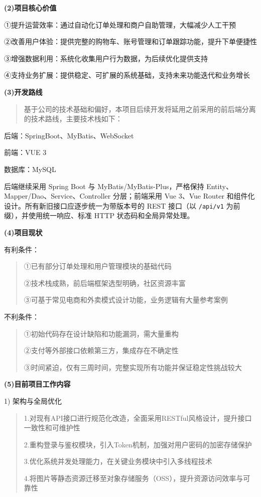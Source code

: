 \textbf{(2)项目核心价值}

①提升运营效率：通过自动化订单处理和商户自助管理，大幅减少人工干预

②改善用户体验：提供完整的购物车、账号管理和订单跟踪功能，提升下单便捷性

③增强数据利用：系统化收集用户行为数据，为后续优化提供支持

④支持业务扩展：提供稳定、可扩展的系统基础，支持未来功能迭代和业务增长

\textbf{(3)开发路线}

\begin{quote}
基于公司的技术基础和偏好，本项目后续开发将延用之前采用的前后端分离的技术路线，主要技术栈如下：
\end{quote}

后端：SpringBoot、MyBatis、WebSocket

前端：VUE 3

数据库：MySQL

{\color{red}
后端继续采用 Spring Boot 与 MyBatis/MyBatis-Plus，严格保持 Entity、Mapper/Dao、Service、Controller 分层；前端采用 Vue 3、Vue Router 和组件化设计。所有新旧接口应逐步统一为带版本号的 REST 接口（以 \texttt{/api/v1} 为前缀），并使用统一响应、标准 HTTP 状态码和全局异常处理。
}

\textbf{(4)项目现状}

有利条件：

\begin{quote}
①已有部分订单处理和用户管理模块的基础代码

②技术栈成熟，前后端框架选型明确，社区资源丰富

③可基于常见电商和外卖模式设计功能，业务逻辑有大量参考案例
\end{quote}

不利条件：

\begin{quote}
①初始代码存在设计缺陷和功能漏洞，需大量重构

②支付等外部接口依赖第三方，集成存在不确定性

③时间紧迫，仅有三周时间，完整实现所有功能并保证稳定性挑战较大
\end{quote}

\textbf{(5)目前项目工作内容}

1) 架构与全局优化

\begin{quote}
1.对现有API接口进行规范化改造，全面采用RESTful风格设计，提升接口一致性和可维护性

2.重构登录与鉴权模块，引入Token机制，加强对用户密码的加密存储保护

3.优化系统并发处理能力，在关键业务模块中引入多线程技术

4.将图片等静态资源迁移至对象存储服务（OSS），提升资源访问效率与可靠性
\end{quote}

